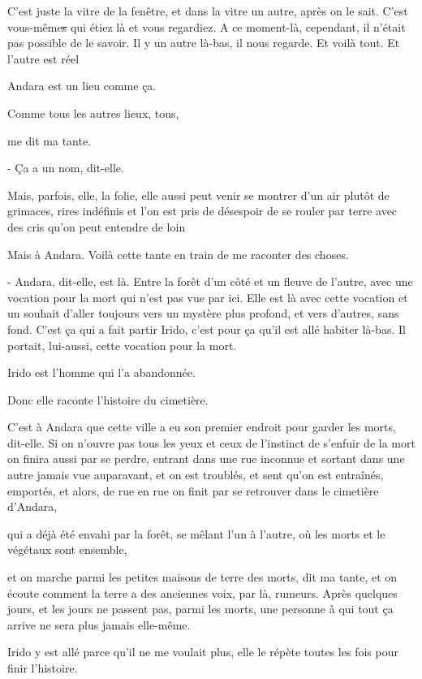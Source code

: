 C'est juste la vitre de la fenêtre, et dans la vitre un autre, après on
le sait. C'est vous-même\sout{s} qui étiez là et vous regardiez. A ce
moment-là, cependant, il n'était pas possible de le savoir. Il y un
autre là-bas, il nous regarde. Et voilà tout. Et l'autre est réel

Andara est un lieu comme ça.

Comme tous les autres lieux, tous,

me dit ma tante.

- Ça a un nom, dit-elle.

 Mais, parfois, elle, la folie, elle aussi peut venir se montrer d'un air
plutôt de grimaces, rires indéfinis et l'on est pris de désespoir de se
rouler par terre avec des cris qu'on peut entendre de loin

Mais à Andara. Voilà cette tante en train de me raconter des choses.

- Andara, dit-elle, est là. Entre la forêt d'un côté et un fleuve de
  l'autre, avec une vocation pour la mort qui n'est pas vue par ici.
  Elle est là avec cette vocation et un souhait d'aller toujours vers un
  mystère plus profond, et vers d'autres, sans fond. C'est ça qui a fait
  partir Irido, c'est pour ça qu'il est allé habiter là-bas. Il portait,
  lui-aussi, cette vocation pour la mort.

Irido est l'homme qui l'a abandonnée.

Donc elle raconte l'histoire du cimetière.

C'est à Andara que cette ville a eu son premier endroit pour garder les
morts, dit-elle. Si on n'ouvre pas tous les yeux et ceux de l'instinct
de s'enfuir de la mort on finira aussi par se perdre, entrant dans une
rue inconnue et sortant dans une autre jamais vue auparavant, et on est
troublés, et sent qu'on est entraînés, emportés, et alors, de rue en rue
on finit par se retrouver dans le cimetière d'Andara,

qui a déjà été envahi par la forêt, se mêlant l'un à l'autre, où les
morts et le végétaux sont ensemble,

et on marche parmi les petites maisons de terre des morts, dit ma tante,
et on écoute comment la terre a des anciennes voix, par là, rumeurs.
Après quelques jours, et les jours ne passent pas, parmi les morts, une
personne à qui tout ça arrive ne sera plus jamais elle-même.

Irido y est allé parce qu'il ne me voulait plus, elle le répète toutes
les fois pour finir l'histoire.


